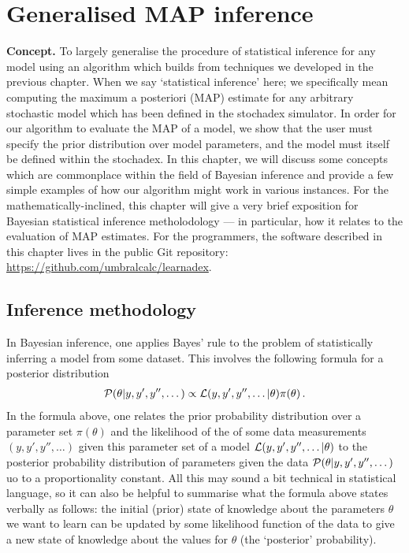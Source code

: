 \chapter{\sffamily Generalised MAP inference}

{\bfseries\sffamily Concept.} To largely generalise the procedure of statistical inference for any model using an algorithm which builds from techniques we developed in the previous chapter. When we say `statistical inference' here; we specifically mean computing the maximum a posteriori (MAP) estimate for any arbitrary stochastic model which has been defined in the stochadex simulator. In order for our algorithm to evaluate the MAP of a model, we show that the user must specify the prior distribution over model parameters, and the model must itself be defined within the stochadex. In this chapter, we will discuss some concepts which are commonplace within the field of Bayesian inference and provide a few simple examples of how our algorithm might work in various instances. For the mathematically-inclined, this chapter will give a very brief exposition for Bayesian statistical inference metholodology --- in particular, how it relates to the evaluation of MAP estimates. For the programmers, the software described in this chapter lives in the public Git repository: \href{https://github.com/umbralcalc/learnadex}{https://github.com/umbralcalc/learnadex}.


\section{\sffamily Inference methodology}

In Bayesian inference, one applies Bayes' rule to the problem of statistically inferring a model from some dataset. This involves the following formula for a posterior distribution
\begin{align}
{\cal P}(\theta \vert y, y', y'', \dots) \propto {\cal L}(y, y', y'', \dots\vert \theta )\pi (\theta ) \label{eq:bayes-rule} \,.
\end{align}
In the formula above, one relates the prior probability distribution over a parameter set $\pi (\theta )$ and the likelihood of the of some data measurements $(y, y', y'', \dots)$ given this parameter set of a model ${\cal L}(y, y', y'', \dots \vert \theta )$ to the posterior probability distribution of parameters given the data ${\cal P}(\theta \vert y, y', y'', \dots)$ uo to a proportionality constant. All this may sound a bit technical in statistical language, so it can also be helpful to summarise what the formula above states verbally as follows: the initial (prior) state of knowledge about the parameters $\theta$ we want to learn can be updated by some likelihood function of the data to give a new state of knowledge about the values for $\theta$ (the `posterior' probability). 

